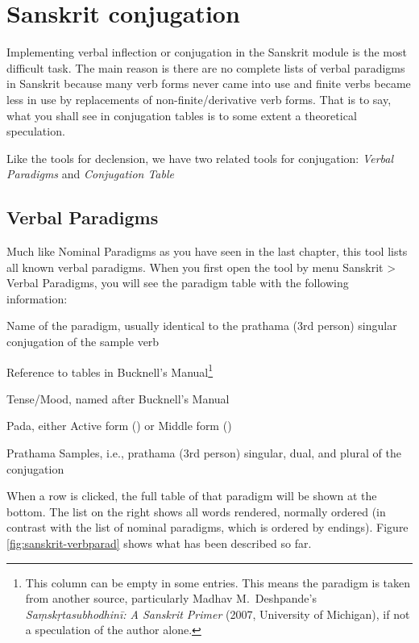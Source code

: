 \chapter{Sanskrit conjugation}

Implementing verbal inflection or conjugation in the Sanskrit module is the most difficult task. The main reason is there are no complete lists of verbal paradigms in Sanskrit because many verb forms never came into use and finite verbs became less in use by replacements of non-finite/derivative verb forms. That is to say, what you shall see in conjugation tables is to some extent a theoretical speculation.

Like the tools for declension, we have two related tools for conjugation: \emph{Verbal Paradigms} and \emph{Conjugation Table}

\section{Verbal Paradigms}

Much like Nominal Paradigms as you have seen in the last chapter, this tool lists all known verbal paradigms. When you first open the tool by menu Sanskrit > {\faSix {}} Verbal Paradigms, you will see the paradigm table with the following information:

\begin{compactenum}
\item Name of the paradigm, usually identical to the prathama (3rd person) singular conjugation of the sample verb
\item Reference to tables in Bucknell's Manual\footnote{This column can be empty in some entries. This means the paradigm is taken from another source, particularly Madhav M.\ Deshpande's \emph{Saṃskṛtasubhodhinī: A Sanskrit Primer} (2007, University of Michigan), if not a speculation of the author alone.}
\item Tense/Mood, named after Bucknell's Manual
\item Pada, either Active form () or Middle form ()
\item Prathama Samples, i.e., prathama (3rd person) singular, dual, and plural of the conjugation
\end{compactenum}

When a row is clicked, the full table of that paradigm will be shown at the bottom. The list on the right shows all words rendered, normally ordered (in contrast with the list of nominal paradigms, which is ordered by endings). Figure \ref{fig:sanskrit-verbparad} shows what has been described so far.

